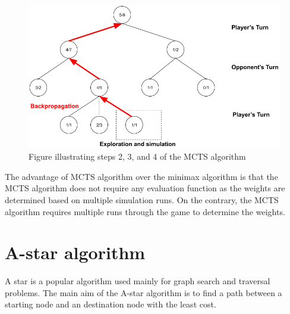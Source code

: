 \begin{figure}[!ht]
    \centering
    \includegraphics[width=\linewidth]{../img/MCTS2.png}
    \caption{Figure illustrating steps 2, 3, and 4 of the MCTS algorithm}
    \label{fig:MCTS2}
\end{figure}

The advantage of \gls{MCTS} algorithm over the minimax algorithm is that the \gls{MCTS} algorithm does not require any evaluation function as the weights are determined based on multiple simulation runs. On the contrary, the \gls{MCTS} algorithm requires multiple runs through the game to determine the weights.

\section{A-star algorithm}

A star is a popular algorithm \citep{Hart1968AFormal} used mainly for graph search and traversal problems. The main aim of the A-star algorithm is to find a path between a starting node and an destination node with the least cost.